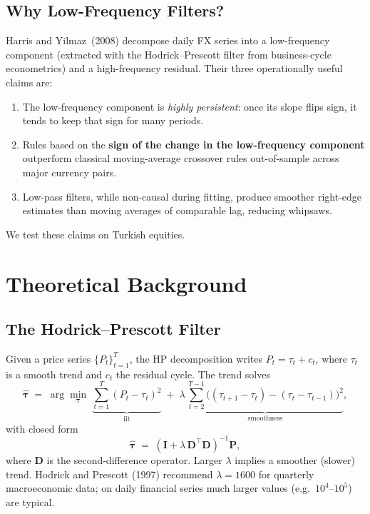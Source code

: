 \documentclass[11pt,a4paper]{article}
\begin{document}
\subsection{Why Low-Frequency Filters?}

Harris and Yilmaz~(2008) decompose daily FX series into a low-frequency
component (extracted with the Hodrick--Prescott filter from business-cycle
econometrics) and a high-frequency residual. Their three operationally useful
claims are:

\begin{enumerate}[leftmargin=1.5em,itemsep=2pt]
    \item The low-frequency component is \emph{highly persistent}: once its slope
          flips sign, it tends to keep that sign for many periods.
    \item Rules based on the \textbf{sign of the change in the low-frequency
          component} outperform classical moving-average crossover rules
          out-of-sample across major currency pairs.
    \item Low-pass filters, while non-causal during fitting, produce smoother
          right-edge estimates than moving averages of comparable lag, reducing
          whipsaws.
\end{enumerate}

We test these claims on Turkish equities.

\section{Theoretical Background}\label{sec:theory}

\subsection{The Hodrick--Prescott Filter}

Given a price series $\{P_t\}_{t=1}^{T}$, the HP decomposition writes
$P_t = \tau_t + c_t$, where $\tau_t$ is a smooth trend and $c_t$ the residual
cycle. The trend solves
\begin{equation}
\widehat{\boldsymbol{\tau}} \;=\; \arg\min_{\boldsymbol{\tau}}\;
\underbrace{\sum_{t=1}^{T}(P_t - \tau_t)^2}_{\text{fit}}
\;+\;\lambda\,
\underbrace{\sum_{t=2}^{T-1}\bigl((\tau_{t+1}-\tau_t)-(\tau_t-\tau_{t-1})\bigr)^2}_{\text{smoothness}},
\label{eq:hp}
\end{equation}
with closed form
\begin{equation}
\widehat{\boldsymbol{\tau}} \;=\; (\mathbf{I} + \lambda\, \mathbf{D}^\top \mathbf{D})^{-1}\mathbf{P},
\label{eq:hp-closed}
\end{equation}
where $\mathbf{D}$ is the second-difference operator. Larger $\lambda$ implies
a smoother (slower) trend. Hodrick and Prescott (1997) recommend
$\lambda{=}1600$ for quarterly macroeconomic data; on daily financial series
much larger values (e.g.\ $10^4$--$10^5$) are typical.
\end{document}
